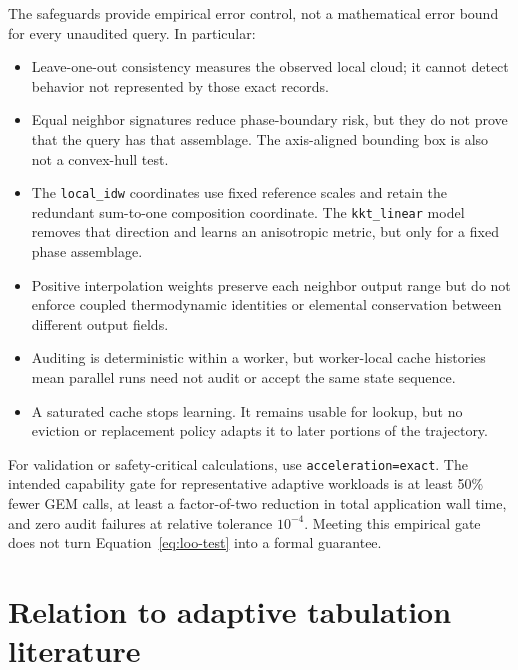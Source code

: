 \documentclass[11pt]{article}
\newcommand{\code}[1]{\texttt{#1}}
\begin{document}
The safeguards provide empirical error control, not a mathematical error bound for every unaudited
query.  In particular:
\begin{itemize}[leftmargin=*]
  \item Leave-one-out consistency measures the observed local cloud; it cannot detect behavior not
  represented by those exact records.
  \item Equal neighbor signatures reduce phase-boundary risk, but they do not prove that the query
  has that assemblage.  The axis-aligned bounding box is also not a convex-hull test.
  \item The \code{local\_idw} coordinates use fixed reference scales and retain the redundant
  sum-to-one composition coordinate.  The \code{kkt\_linear} model removes that direction and
  learns an anisotropic metric, but only for a fixed phase assemblage.
  \item Positive interpolation weights preserve each neighbor output range but do not enforce
  coupled thermodynamic identities or elemental conservation between different output fields.
  \item Auditing is deterministic within a worker, but worker-local cache histories mean parallel
  runs need not audit or accept the same state sequence.
  \item A saturated cache stops learning.  It remains usable for lookup, but no eviction or
  replacement policy adapts it to later portions of the trajectory.
\end{itemize}

For validation or safety-critical calculations, use \code{acceleration=exact}.  The intended
capability gate for representative adaptive workloads is at least 50\% fewer GEM calls, at least a
factor-of-two reduction in total application wall time, and zero audit failures at relative
tolerance $10^{-4}$.  Meeting this empirical gate does not turn Equation~\eqref{eq:loo-test} into a
formal guarantee.

\section{Relation to adaptive tabulation literature}
\end{document}
